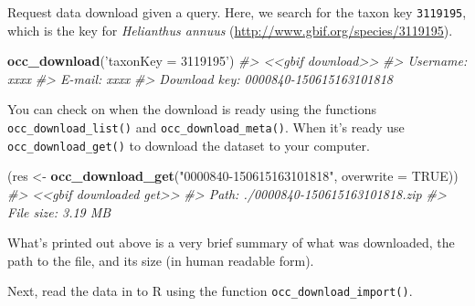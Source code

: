 \documentclass[author-year, review, 11pt]{components/elsarticle} %
\newenvironment{Shaded}{\begin{snugshade}}{\end{snugshade}}
\newcommand{\KeywordTok}[1]{\textcolor[rgb]{0.13,0.29,0.53}{\textbf{#1}}}
\newcommand{\DataTypeTok}[1]{\textcolor[rgb]{0.13,0.29,0.53}{#1}}
\newcommand{\StringTok}[1]{\textcolor[rgb]{0.31,0.60,0.02}{#1}}
\newcommand{\CommentTok}[1]{\textcolor[rgb]{0.56,0.35,0.01}{\textit{#1}}}
\newcommand{\OtherTok}[1]{\textcolor[rgb]{0.56,0.35,0.01}{#1}}
\newcommand{\NormalTok}[1]{#1}
\begin{document}
Request data download given a query. Here, we search for the taxon key
\texttt{3119195}, which is the key for \emph{Helianthus annuus}
(\url{http://www.gbif.org/species/3119195}).

\begin{Shaded}
\begin{Highlighting}[]
\KeywordTok{occ_download}\NormalTok{(}\StringTok{'taxonKey = 3119195'}\NormalTok{)}
\CommentTok{#> <<gbif download>>}
\CommentTok{#>   Username: xxxx}
\CommentTok{#>   E-mail: xxxx}
\CommentTok{#>   Download key: 0000840-150615163101818}
\end{Highlighting}
\end{Shaded}

You can check on when the download is ready using the functions
\texttt{occ\_download\_list()} and \texttt{occ\_download\_meta()}. When
it's ready use \texttt{occ\_download\_get()} to download the dataset to
your computer.

\begin{Shaded}
\begin{Highlighting}[]
\NormalTok{(res <-}\StringTok{ }\KeywordTok{occ_download_get}\NormalTok{(}\StringTok{"0000840-150615163101818"}\NormalTok{, }\DataTypeTok{overwrite =} \OtherTok{TRUE}\NormalTok{))}
\CommentTok{#> <<gbif downloaded get>>}
\CommentTok{#>   Path: ./0000840-150615163101818.zip}
\CommentTok{#>   File size: 3.19 MB}
\end{Highlighting}
\end{Shaded}

What's printed out above is a very brief summary of what was downloaded,
the path to the file, and its size (in human readable form).

Next, read the data in to R using the function
\texttt{occ\_download\_import()}.
\end{document}
